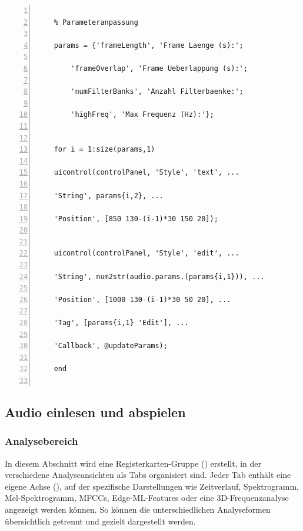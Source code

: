 \begin{lstlisting}[frame=single, numbers=left, style=Matlab-Pyglike]
    
    % Parameteranpassung
    
    params = {'frameLength', 'Frame Laenge (s):';
        
        'frameOverlap', 'Frame Ueberlappung (s):';
        
        'numFilterBanks', 'Anzahl Filterbaenke:';
        
        'highFreq', 'Max Frequenz (Hz):'};
    
    
    for i = 1:size(params,1)
    
    uicontrol(controlPanel, 'Style', 'text', ...
    
    'String', params{i,2}, ...
    
    'Position', [850 130-(i-1)*30 150 20]);
    
    
    uicontrol(controlPanel, 'Style', 'edit', ...
    
    'String', num2str(audio.params.(params{i,1})), ...
    
    'Position', [1000 130-(i-1)*30 50 20], ...
    
    'Tag', [params{i,1} 'Edit'], ...
    
    'Callback', @updateParams);
    
    end
    
\end{lstlisting}

\subsection{Audio einlesen und abspielen}

\subsubsection{Analysebereich}

In diesem Abschnitt wird eine Registerkarten-Gruppe () erstellt, in der verschiedene Analyseansichten als Tabs organisiert sind. Jeder Tab enthält eine eigene Achse (), auf der spezifische Darstellungen wie Zeitverlauf, Spektrogramm, Mel-Spektrogramm, MFCCs, Edge-ML-Features oder eine 3D-Frequenzanalyse angezeigt werden können. So können die unterschiedlichen Analyseformen übersichtlich getrennt und gezielt dargestellt werden. \cite{Hossain:2025} \cite{MathWorks:2025RaspberryPiAudio}


